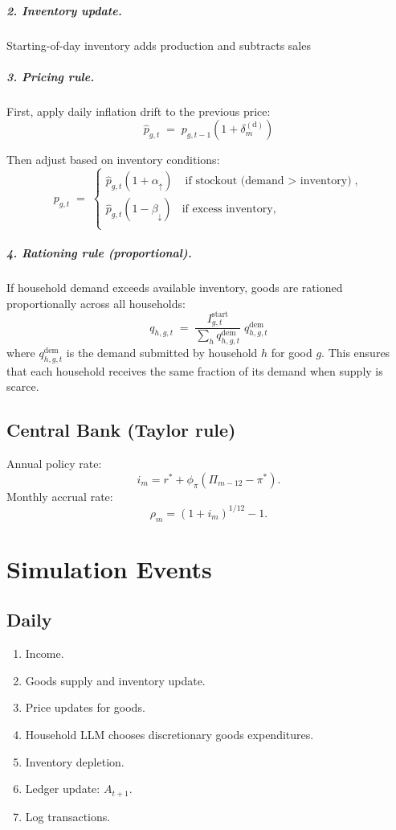 \documentclass[12pt]{article}
\begin{document}
\subparagraph{2. Inventory update.}  
Starting-of-day inventory adds production and subtracts sales

\subparagraph{3. Pricing rule.}  
First, apply daily inflation drift to the previous price:
$$
\hat{p}_{g,t} \;=\; p_{g,t-1}\left(1+\delta_m^{(\mathrm{d})}\right)
$$

Then adjust based on inventory conditions:
$$
p_{g,t} \;=\;
\begin{cases}
\hat{p}_{g,t}(1+\alpha_{\uparrow}) & \text{if stockout (demand $>$ inventory)}, \\[6pt]
\hat{p}_{g,t}(1-\beta_{\downarrow}) & \text{if excess inventory}, \\[6pt]
\end{cases}
$$

\subparagraph{4. Rationing rule (proportional).}  
If household demand exceeds available inventory, goods are rationed proportionally across all households:
$$
q_{h,g,t} \;=\; \frac{I_{g,t}^{\mathrm{start}}}{\sum_h q_{h,g,t}^{\mathrm{dem}}} \; q_{h,g,t}^{\mathrm{dem}}
$$
where $q_{h,g,t}^{\mathrm{dem}}$ is the demand submitted by household $h$ for good $g$.  
This ensures that each household receives the same fraction of its demand when supply is scarce.

\subsection*{Central Bank (Taylor rule)}
Annual policy rate:
$$
i_m=r^*+\phi_\pi\left(\Pi_{m-12}-\pi^*\right).
$$
Monthly accrual rate:
$$
\rho_m=(1+i_m)^{1/12}-1.
$$

\section{Simulation Events}

\subsection*{Daily}
\begin{enumerate}
\item Income.
\item Goods supply and inventory update.
\item Price updates for goods.
\item Household LLM chooses discretionary goods expenditures.
\item Inventory depletion.
\item Ledger update: $A_{t+1}$.
\item Log transactions.
\end{enumerate}
\end{document}
